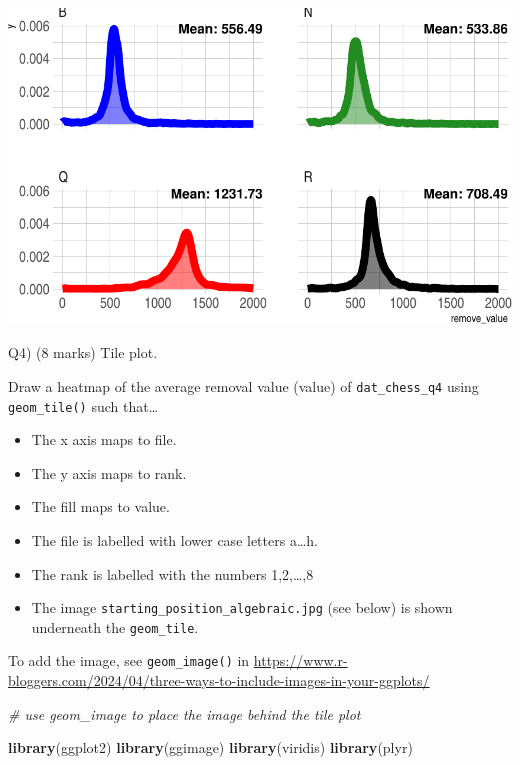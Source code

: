 \documentclass[
]{article}
\newenvironment{Shaded}{\begin{snugshade}}{\end{snugshade}}
\newcommand{\CommentTok}[1]{\textcolor[rgb]{0.56,0.35,0.01}{\textit{#1}}}
\newcommand{\FunctionTok}[1]{\textcolor[rgb]{0.13,0.29,0.53}{\textbf{#1}}}
\newcommand{\NormalTok}[1]{#1}
\providecommand{\tightlist}{%
  \setlength{\itemsep}{0pt}\setlength{\parskip}{0pt}}
\begin{document}
\includegraphics{STAT842_Assignment2_files/figure-latex/unnamed-chunk-5-1.pdf}

\newpage

Q4) (8 marks) Tile plot.

Draw a heatmap of the average removal value (value) of
\texttt{dat\_chess\_q4} using \texttt{geom\_tile()} such that\ldots{}

\begin{itemize}
\tightlist
\item
  The x axis maps to file.
\item
  The y axis maps to rank.
\item
  The fill maps to value.
\item
  The file is labelled with lower case letters a\ldots h.
\item
  The rank is labelled with the numbers 1,2,\ldots,8
\item
  The image \texttt{starting\_position\_algebraic.jpg} (see below) is
  shown underneath the \texttt{geom\_tile}.
\end{itemize}

To add the image, see \texttt{geom\_image()} in
\url{https://www.r-bloggers.com/2024/04/three-ways-to-include-images-in-your-ggplots/}

\begin{Shaded}
\begin{Highlighting}[]
\CommentTok{\# use geom\_image to place the image behind the tile plot }

\FunctionTok{library}\NormalTok{(ggplot2)}
\FunctionTok{library}\NormalTok{(ggimage)}
\FunctionTok{library}\NormalTok{(viridis)}
\FunctionTok{library}\NormalTok{(plyr)}
\end{Highlighting}
\end{Shaded}
\end{document}
